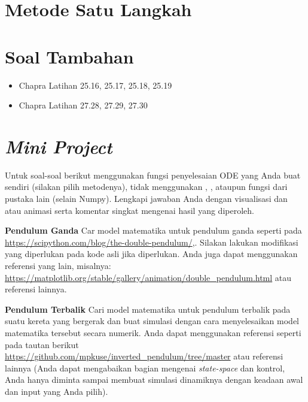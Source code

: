 \section{Metode Satu Langkah}











\section{Soal Tambahan}

\begin{itemize}
\item Chapra Latihan 25.16, 25.17, 25.18, 25.19
\item Chapra Latihan 27.28, 27.29, 27.30
\end{itemize}


\section{\textit{Mini Project}}

Untuk soal-soal berikut menggunakan fungsi penyelesaian ODE yang Anda buat sendiri (silakan pilih
metodenya), tidak menggunakan , , ataupun fungsi
dari pustaka lain (selain Numpy).
Lengkapi jawaban Anda dengan visualisasi dan atau animasi serta komentar singkat
mengenai hasil yang diperoleh.

\textbf{Pendulum Ganda}
Car model matematika untuk pendulum ganda seperti
pada {\footnotesize \url{https://scipython.com/blog/the-double-pendulum/}},.
Silakan lakukan modifikasi yang diperlukan
pada kode asli jika diperlukan.
Anda juga dapat menggunakan referensi yang lain, misalnya:
{\footnotesize \url{https://matplotlib.org/stable/gallery/animation/double_pendulum.html}}
atau referensi lainnya.

\textbf{Pendulum Terbalik} Cari model matematika untuk pendulum terbalik pada suatu
kereta yang bergerak dan
buat simulasi dengan cara menyelesaikan model matematika tersebut secara numerik.
Anda dapat menggunakan referensi seperti pada tautan berikut
{\footnotesize \url{https://github.com/mpkuse/inverted_pendulum/tree/master}}
atau referensi lainnya (Anda dapat mengabaikan bagian mengenai
\textit{state-space} dan kontrol, Anda hanya diminta sampai membuat simulasi dinamiknya
dengan keadaan awal dan input yang Anda pilih).

